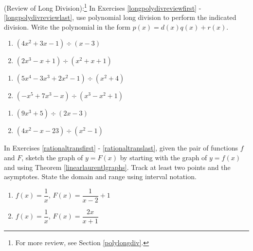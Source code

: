 (Review of Long Division):\footnote{For more review, see Section \ref{polylongdiv}.}  In Exercises \ref{longpolydivreviewfirst} - \ref{longpolydivreviewlast}, use polynomial long division to perform the indicated division.  Write the polynomial in the form $p(x) = d(x)q(x) + r(x)$.

\begin{multicols}{2}
\begin{enumerate}
\item $\left(4x^2+3x-1 \right) \div (x-3)$ \label{longpolydivreviewfirst}
\item $\left(2x^3-x+1 \right) \div \left(x^{2} +x+1 \right)$ 

\setcounter{HW}{\value{enumi}}
\end{enumerate}
\end{multicols}

\begin{multicols}{2}
\begin{enumerate}
\setcounter{enumi}{\value{HW}}

\item $\left(5x^{4} - 3x^{3} + 2x^{2} - 1 \right) \div \left(x^{2} + 4 \right)$
\item $\left(-x^{5} + 7x^{3} - x \right) \div \left(x^{3} - x^{2} + 1 \right)$

\setcounter{HW}{\value{enumi}}
\end{enumerate}
\end{multicols}

\begin{multicols}{2}
\begin{enumerate}
\setcounter{enumi}{\value{HW}}

\item $\left(9x^{3} + 5 \right) \div \left(2x - 3 \right)$
\item $\left(4x^2 - x - 23 \right) \div \left(x^{2} - 1 \right)$ \label{longpolydivreviewlast}

\setcounter{HW}{\value{enumi}}
\end{enumerate}
\end{multicols}


In Exercises \ref{rationaltransfirst} - \ref{rationaltranslast}, given the pair of functions $f$ and $F$, sketch the graph of $y=F(x)$ by starting with the graph of $y = f(x)$ and using Theorem \ref{linearlaurentlgraphs}.   Track at least two points and the asymptotes.  State the domain and range using interval notation.


\begin{multicols}{2}
\begin{enumerate}
\setcounter{enumi}{\value{HW}}
\item $f(x) = \dfrac{1}{x}$,  $F(x) = \dfrac{1}{x-2}+1$ \label{rationaltransfirst}
\item $f(x) =\dfrac{1}{x}$, $F(x) = \dfrac{2x}{x+1}$

\setcounter{HW}{\value{enumi}}
\end{enumerate}
\end{multicols}

